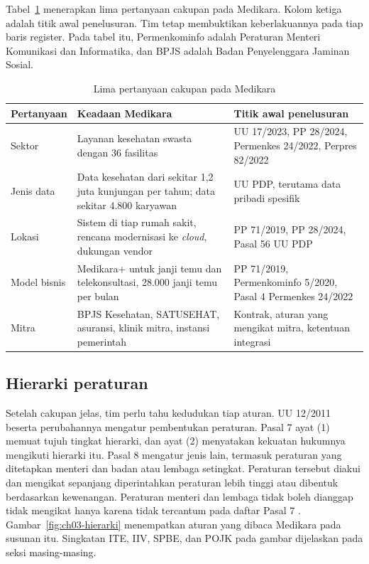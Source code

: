 Tabel~\ref{tab:ch03-cakupan} menerapkan lima pertanyaan cakupan pada Medikara. Kolom ketiga
adalah titik awal penelusuran. Tim tetap membuktikan keberlakuannya pada tiap baris register.
Pada tabel itu, Permenkominfo adalah Peraturan Menteri Komunikasi dan Informatika, dan BPJS
adalah Badan Penyelenggara Jaminan Sosial.

\begin{table}[!htb]
  \centering\small
  \caption{Lima pertanyaan cakupan pada Medikara}\label{tab:ch03-cakupan}
  \begin{tabularx}{\textwidth}{|>{\raggedright\arraybackslash}p{}|>{\raggedright\arraybackslash}X|>{\raggedright\arraybackslash}X|}
    \hline
    \textbf{Pertanyaan} & \textbf{Keadaan Medikara} & \textbf{Titik awal penelusuran} \\ \hline
    Sektor & Layanan kesehatan swasta dengan 36 fasilitas & UU 17/2023, PP 28/2024, Permenkes
    24/2022, Perpres 82/2022 \\ \hline
    Jenis data & Data kesehatan dari sekitar 1,2 juta kunjungan per tahun; data sekitar 4.800
    karyawan & UU PDP, terutama data pribadi spesifik \\ \hline
    Lokasi & Sistem di tiap rumah sakit, rencana modernisasi ke \textit{cloud}, dukungan vendor
    & PP 71/2019, PP 28/2024, Pasal 56 UU PDP \\ \hline
    Model bisnis & Medikara+ untuk janji temu dan telekonsultasi, 28.000 janji temu per bulan &
    PP 71/2019, Permenkominfo 5/2020, Pasal 4 Permenkes 24/2022 \\ \hline
    Mitra & BPJS Kesehatan, SATUSEHAT, asuransi, klinik mitra, instansi pemerintah & Kontrak,
    aturan yang mengikat mitra, ketentuan integrasi \\ \hline
  \end{tabularx}
\end{table}

\subsection*{Hierarki peraturan}

Setelah cakupan jelas, tim perlu tahu kedudukan tiap aturan. UU 12/2011 beserta perubahannya
mengatur pembentukan peraturan. Pasal 7 ayat (1) memuat tujuh tingkat hierarki, dan ayat (2)
menyatakan kekuatan hukumnya mengikuti hierarki itu. Pasal 8 mengatur jenis lain, termasuk
peraturan yang ditetapkan menteri dan badan atau lembaga setingkat. Peraturan tersebut diakui
dan mengikat sepanjang diperintahkan peraturan lebih tinggi atau dibentuk berdasarkan
kewenangan. Peraturan menteri dan lembaga tidak boleh dianggap tidak mengikat hanya karena
tidak tercantum pada daftar Pasal 7 \cite{c03-uu12}. Gambar~\ref{fig:ch03-hierarki} menempatkan
aturan yang dibaca Medikara pada susunan itu. Singkatan ITE, IIV, SPBE, dan POJK pada gambar
dijelaskan pada seksi masing-masing.

